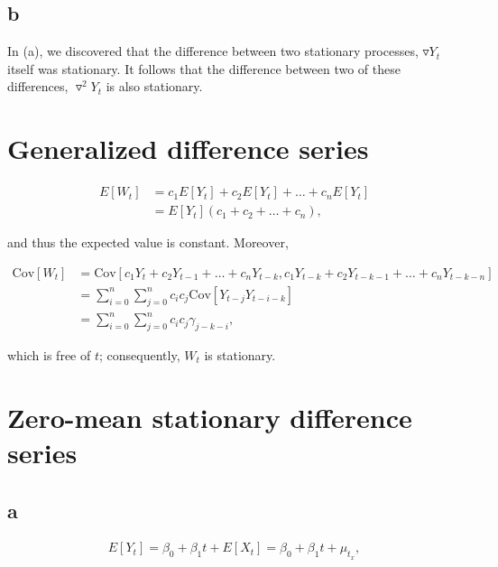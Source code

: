 \documentclass[]{book}
\begin{document}
\subsection*{b}\label{b-5}

In (a), we discovered that the difference between two stationary
processes, \(\triangledown Y_t\) itself was stationary. It follows that
the difference between two of these differences, \(\triangledown^2Y_t\)
is also stationary.

\section{Generalized difference
series}\label{generalized-difference-series}

\begin{align}
  E[W_t] & = c_1E[Y_t]+c_2E[Y_t] + \dots + c_n E[Y_t]\\
         & = E[Y_t](c_1 + c_2 + \dots + c_n),
\end{align}

and thus the expected value is constant. Moreover,

\begin{align}
  \text{Cov}[W_t] & = \text{Cov}[c_1 Y_t + c_2 Y_{t-1} + \dots + c_n Y_{t-k}, c_1 Y_{t-k} + c_2 Y_{t-k-1} + \dots + c_n Y_{t-k-n}] \\
                  & = \sum_{i=0}^n \sum_{j=0}^n c_i c_j \text{Cov}[Y_{t-j}Y_{t-i-k}] \\
                  & = \sum_{i=0}^n \sum_{j=0}^n c_i c_j \gamma_{j-k-i},
\end{align}

which is free of \(t\); consequently, \(W_t\) is stationary.

\section{Zero-mean stationary difference
series}\label{zero-mean-stationary-difference-series}

\subsection*{a}\label{a-6}

\begin{gather*}
  E[Y_t] = \beta_0 + \beta_1 t + E[X_t] = \beta_0 + \beta_1 t + \mu_{t_x},
\end{gather*}
\end{document}
